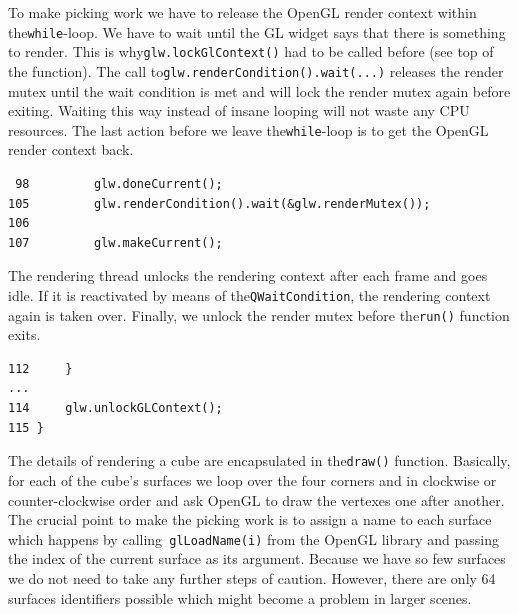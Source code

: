\documentclass[prodmode,acmtopc]{acmsmall}
\begin{document}
To make picking work we have to release the OpenGL render context within the\lstinline|while|-loop.
%
We have to wait until the GL widget says that there is something to render.
%
This is why\lstinline|glw.lockGlContext()| had to be called before (see top of the function).
%
The call to\lstinline|glw.renderCondition().wait(...)| releases the render mutex until the wait condition is met
 and will lock the render mutex again before exiting.
Waiting this way instead of insane looping will not waste any CPU resources.
 The last action before we leave the\lstinline|while|-loop is to get the OpenGL render context back.
%
\begin{lstlisting}
 98         glw.doneCurrent();
105         glw.renderCondition().wait(&glw.renderMutex());
106
107         glw.makeCurrent();
\end{lstlisting}
%
%
The rendering thread unlocks the rendering context after each frame and goes idle.
%
If it is reactivated by means of the\lstinline|QWaitCondition|, the rendering context again is taken over.
%
Finally, we unlock the render mutex before the\lstinline|run()| function exits.
\begin{lstlisting}
112     }
...
114     glw.unlockGLContext();
115 }
\end{lstlisting}
%
The details of rendering a cube are encapsulated in the\lstinline|draw()| function.
%
Basically, for each of the cube's surfaces we loop over the four corners and in clockwise or counter-clockwise order and ask OpenGL to draw the vertexes one after another.
%
The crucial point to make the picking work is to assign a name to each surface which happens by calling\lstinline| glLoadName(i)| from the OpenGL library and passing the index of the current surface as its argument.
%
Because we have so few surfaces we do not need to take any further steps of caution.
%
However, there are only 64 surfaces identifiers possible which might become a problem in larger scenes.
\end{document}
